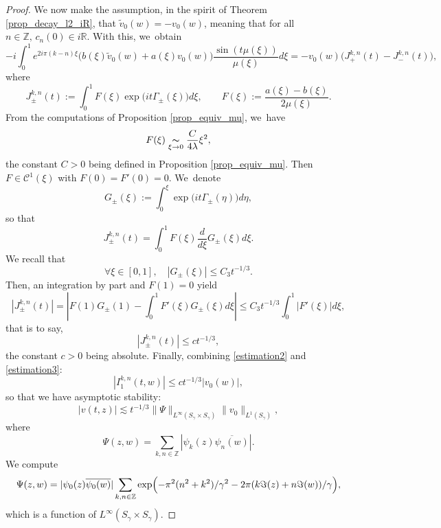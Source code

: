 \documentclass[10pt]{amsart}
\theoremstyle{definition}
\let\EE\exp
\let\ov\overline
\newcommand\R{\mathbb R}
\newcommand\Z{\mathbb Z}
\newcommand{\bpa}[1]{\bigl(#1\bigr)}
\newcommand{\abs}[1]{\left|#1\right|}
\newcommand{\simx}[2]{\underset{#1\to#2}{\thicksim}}
\begin{document}
\begin{proof}
We now make the assumption, in the spirit of Theorem \ref{prop_decay_l2_iR}, that $\widetilde{v}_0(w) = -v_0(w)$, meaning that for all $n \in \Z, \, c_n(0) \in i\R$. With this, we~obtain
\begin{equation*}
- i \int_0^1 e^{2i\pi(k-n)\xi}\bigl(b(\xi)\widetilde{v}_0(w)+a(\xi)v_0(w)\bigr) \frac{\sin(t\mu(\xi))}{\mu(\xi)} d\xi = -v_0(w) \bpa{J_{+}^{k,n}(t)-J_{-}^{k,n}(t)},
\end{equation*}
where
\[
J_\pm^{k,n}(t):= \int_0^1 F(\xi)\EE\bigl({it\Gamma_\pm(\xi)}\bigr)d\xi, \qquad F(\xi):= \frac{a(\xi) - b(\xi)}{2\mu(\xi)}.
\]
From the computations of Proposition \ref{prop_equiv_mu}, we~have
\[
F(\xi) \simx{\xi}{0} \frac{C}{4\lambda} \xi^2,
\]
the constant $C >0$ being defined in Proposition \ref{prop_equiv_mu}. Then $F \in \mathcal{C}^1(\xi)$ with $F(0) = F'(0) = 0$. We~denote
\[
G_\pm(\xi):= \int_0^\xi \EE\bigl({it\Gamma_\pm(\eta)}\bigr) d\eta,
\]
so that
\[
J_\pm^{k,n}(t) = \int_0^1 F(\xi)\frac{d}{d\xi}G_\pm(\xi)d\xi. 
\]
We recall that
\[
\forall \xi \in [0,1], \quad |G_\pm(\xi)| \leq {C_3}{t^{-1/3}}.
\]
Then, an integration by part and $F(1) = 0$ yield
\[
|J_\pm^{k,n}(t)| =\abs{ F(1)G_\pm(1) - \int_0^1 F'(\xi)G_\pm(\xi)d\xi} \leq {C_3}{ t^{-1/3}}\int_0^1 |F'(\xi)|d\xi,
\]
that is to say,
\begin{equation}\label{estimation3}
|J_\pm^{k,n}(t)| \leq {c}{t^{-1/3}},
\end{equation}
the constant $c>0$ being absolute. Finally, combining \eqref{estimation2} and \eqref{estimation3}:
\begin{equation*}
|I_1^{k,n}(t,w)| \leq {c}{t^{-1/3}}|v_0(w)|,
\end{equation*}
so that we have asymptotic stability:
\begin{equation}\label{estimation_u_l_infty}
|v(t,z)| \lesssim {t^{-1/3}}\|\Psi\|_{L^\infty(S_{\gamma}\times S_{\gamma})}\|v_0\|_{L^1(S_{\gamma})},
\end{equation}
where
\begin{equation*}
\Psi(z,w) = \sum_{k,n\in\Z}|\psi_k(z)\ov{\psi_n(w)}|.
\end{equation*}
We compute
\[
\Psi(z,w) =|\psi_0(z)\ov{\psi_0(w)}| \sum_{k,n\in\Z} \EE\Bigl({-{\pi^2(n^2+k^2)}/ {\gamma^2}-{2\pi}(k\Im (z)+n\Im (w))/ {\gamma}}\Bigr), 
\]
which is a function of $L^\infty(S_{\gamma}\times S_{\gamma})$.


\end{proof}
\end{document}
